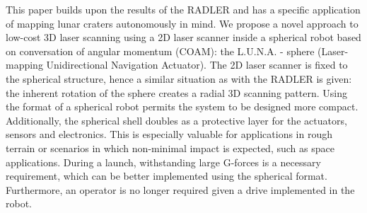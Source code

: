 This paper builds upon the results of the RADLER and has a specific application of mapping lunar craters autonomously in mind.
We propose a novel approach to low-cost 3D laser scanning using a 2D laser scanner inside a spherical robot based on conversation of angular momentum (COAM): the L.U.N.A. - sphere (Laser-mapping Unidirectional Navigation Actuator).
The 2D laser scanner is fixed to the spherical structure, hence a similar situation as with the RADLER is given: the inherent rotation of the sphere creates a radial 3D scanning pattern.
Using the format of a spherical robot permits the system to be designed more compact. 
Additionally, the spherical shell doubles as a protective layer for the actuators, sensors and electronics. 
This is especially valuable for applications in rough terrain or scenarios in which non-minimal impact is expected, such as space applications.
During a launch, withstanding large G-forces is a necessary requirement, which can be better implemented using the spherical format. 
Furthermore, an operator is no longer required given a drive implemented in the robot.
